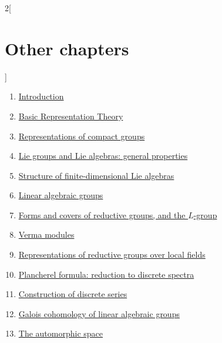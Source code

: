 \begin{multicols}{2}[\section{Other chapters}]
\noindent
\begin{enumerate}
\item \hyperref[introduction-section-phantom]{Introduction}
\item \hyperref[representationtheory-section-phantom]{Basic Representation Theory}
\item \hyperref[representations-compact-section-phantom]{Representations of compact groups}
\item \hyperref[liegroups-general-section-phantom]{Lie groups and Lie algebras: general properties}
\item \hyperref[liestructure-section-phantom]{Structure of finite-dimensional Lie algebras}
\item \hyperref[algebraicgroups-section-phantom]{Linear algebraic groups}
\item \hyperref[reductiveforms-section-phantom]{Forms and covers of reductive groups, and the $L$-group}
\item \hyperref[vermamodules-section-phantom]{Verma modules}
\item \hyperref[representations-local-section-phantom]{Representations of reductive groups over local fields}
\item \hyperref[plancherel-section-phantom]{Plancherel formula: reduction to discrete spectra}
\item \hyperref[discreteseries-section-phantom]{Construction of discrete series}
\item \hyperref[galoiscohomology-section-phantom]{Galois cohomology of linear algebraic groups}
\item \hyperref[automorphicspace-section-phantom]{The automorphic space}

\end{enumerate}
\end{multicols}

